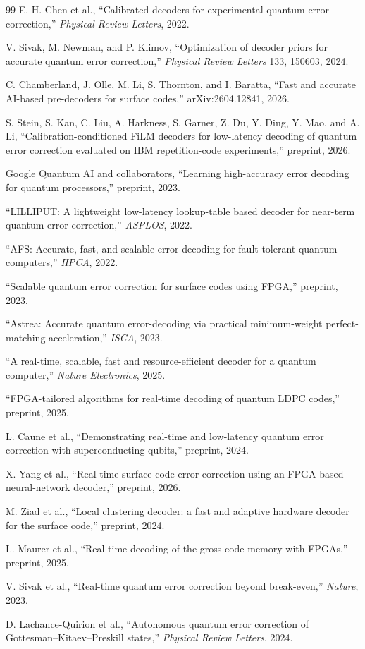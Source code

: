 \documentclass[11pt]{article}
\begin{document}
\begin{thebibliography}{99}
E. H. Chen et al.,
``Calibrated decoders for experimental quantum error correction,''
\emph{Physical Review Letters}, 2022.

V. Sivak, M. Newman, and P. Klimov,
``Optimization of decoder priors for accurate quantum error correction,''
\emph{Physical Review Letters} 133, 150603, 2024.

C. Chamberland, J. Olle, M. Li, S. Thornton, and I. Baratta,
``Fast and accurate AI-based pre-decoders for surface codes,''
arXiv:2604.12841, 2026.

S. Stein, S. Kan, C. Liu, A. Harkness, S. Garner, Z. Du, Y. Ding, Y. Mao, and
A. Li,
``Calibration-conditioned FiLM decoders for low-latency decoding of quantum
error correction evaluated on IBM repetition-code experiments,''
preprint, 2026.

Google Quantum AI and collaborators,
``Learning high-accuracy error decoding for quantum processors,''
preprint, 2023.

``LILLIPUT: A lightweight low-latency lookup-table based decoder for near-term
quantum error correction,''
\emph{ASPLOS}, 2022.

``AFS: Accurate, fast, and scalable error-decoding for fault-tolerant quantum
computers,''
\emph{HPCA}, 2022.

``Scalable quantum error correction for surface codes using FPGA,''
preprint, 2023.

``Astrea: Accurate quantum error-decoding via practical minimum-weight
perfect-matching acceleration,''
\emph{ISCA}, 2023.

``A real-time, scalable, fast and resource-efficient decoder for a quantum
computer,''
\emph{Nature Electronics}, 2025.

``FPGA-tailored algorithms for real-time decoding of quantum LDPC codes,''
preprint, 2025.

L. Caune et al.,
``Demonstrating real-time and low-latency quantum error correction with
superconducting qubits,''
preprint, 2024.

X. Yang et al.,
``Real-time surface-code error correction using an FPGA-based neural-network
decoder,''
preprint, 2026.

M. Ziad et al.,
``Local clustering decoder: a fast and adaptive hardware decoder for the
surface code,''
preprint, 2024.

L. Maurer et al.,
``Real-time decoding of the gross code memory with FPGAs,''
preprint, 2025.

V. Sivak et al.,
``Real-time quantum error correction beyond break-even,''
\emph{Nature}, 2023.

D. Lachance-Quirion et al.,
``Autonomous quantum error correction of Gottesman--Kitaev--Preskill states,''
\emph{Physical Review Letters}, 2024.

\end{thebibliography}
\end{document}
